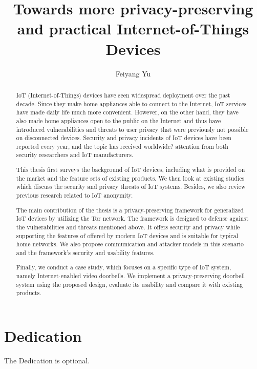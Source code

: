\documentclass[12pt]{report}
\title{Towards more privacy-preserving and practical Internet-of-Things Devices}
\author{Feiyang Yu}
\begin{document}

\maketitle    %

\begin{abstract}

IoT (Internet-of-Things) devices have seen widespread deployment over the past decade. Since they make home appliances able to connect to the Internet, IoT services have made daily life much more convenient. However, on the other hand, they have also made home appliances open to the public on the Internet and thus have introduced vulnerabilities and threats to user privacy that were previously not possible on disconnected devices. Security and privacy incidents of IoT devices have been reported every year, and the topic has received worldwide? attention from both security researchers and IoT manufacturers.

This thesis first surveys the background of IoT devices, including what is provided on the market and the feature sets of existing products. We then look at existing studies which discuss the security and privacy threats of IoT systems. Besides, we also review previous research related to IoT anonymity.

The main contribution of the thesis is a privacy-preserving framework for generalized IoT devices by utilizing the Tor network. The framework is designed to defense against the vulnerabilities and threats mentioned above. It offers security and privacy while supporting the features of offered by modern IoT devices and is suitable for typical home networks. We also propose communication and attacker models in this scenario and the framework's security and usability features.

Finally, we conduct a case study, which focuses on a specific type of IoT system, namely Internet-enabled video doorbells. We implement a privacy-preserving doorbell system using the proposed design, evaluate its usability and compare it with existing products.

\end{abstract}


\chapter*{Dedication}

The Dedication is optional.
\end{document}

